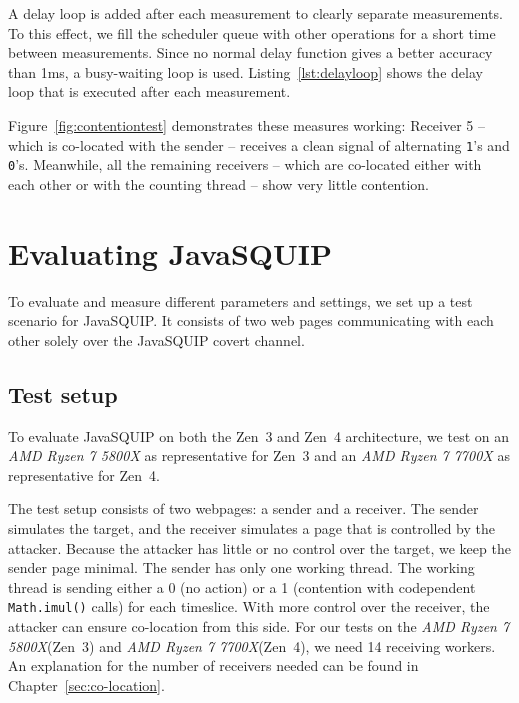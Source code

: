 \documentclass[11pt,
  titlepage=false,
  parskip=half,      %
]{scrreprt}
\begin{document}
A delay loop is added after each measurement to clearly separate measurements.
To this effect, we fill the scheduler queue with other operations for a short time between measurements.
Since no normal delay function gives a better accuracy than 1ms, a busy-waiting loop is used.
Listing~\ref{lst:delayloop} shows the delay loop that is executed after each measurement.


Figure~\ref{fig:contentiontest} demonstrates these measures working:
Receiver 5 -- which is co-located with the sender -- receives a clean signal of alternating \texttt{1}'s and \texttt{0}'s.
Meanwhile, all the remaining receivers -- which are co-located either with each other or with the counting thread -- show very little contention.


\chapter{Evaluating JavaSQUIP}
\label{ch:evaluation}

To evaluate and measure different parameters and settings, we set up a test scenario for JavaSQUIP.
It consists of two web pages communicating with each other solely over the JavaSQUIP covert channel.

\section {Test setup}
\label{sec:testsetup}
To evaluate JavaSQUIP on both the Zen~3 and Zen~4 architecture,
we test on an \textit{AMD Ryzen 7 5800X} as representative for Zen~3 and an \textit{AMD Ryzen 7 7700X} as representative for Zen~4.

The test setup consists of two webpages: a sender and a receiver.
The sender simulates the target, and the receiver simulates a page that is controlled by the attacker.
Because the attacker has little or no control over the target, we keep the sender page minimal.
The sender has only one working thread.
The working thread is sending either a 0 (no action) or a 1 (contention with codependent \texttt{Math.imul()} calls) for each timeslice.
With more control over the receiver, the attacker can ensure co-location from this side.
For our tests on the \textit{AMD Ryzen 7 5800X}(Zen~3) and \textit{AMD Ryzen 7 7700X}(Zen~4), we need 14 receiving workers.
An explanation for the number of receivers needed can be found in Chapter~\ref{sec:co-location}.
\end{document}
